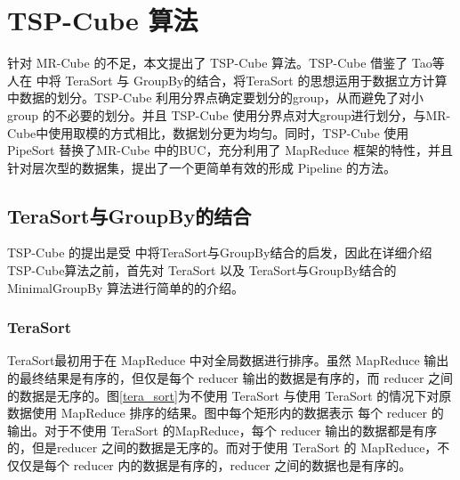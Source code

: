 \chapter{TSP-Cube 算法}

针对 MR-Cube 的不足，本文提出了 TSP-Cube 算法。TSP-Cube 借鉴了 Tao等人在 \cite{tao2013minimal} 中将 TeraSort 与 GroupBy的结合，将TeraSort 的思想运用于数据立方计算中数据的划分。TSP-Cube 利用分界点确定要划分的group，从而避免了对小 group 的不必要的划分。并且 TSP-Cube 使用分界点对大group进行划分，与MR-Cube中使用取模的方式相比，数据划分更为均匀。同时，TSP-Cube 使用PipeSort 替换了MR-Cube 中的BUC，充分利用了 MapReduce 框架的特性，并且针对层次型的数据集，提出了一个更简单有效的形成 Pipeline 的方法。



\section{TeraSort与GroupBy的结合}

TSP-Cube 的提出是受 \cite{tao2013minimal} 中将TeraSort与GroupBy结合的启发，因此在详细介绍TSP-Cube算法之前，首先对 TeraSort 以及 TeraSort与GroupBy结合的 MinimalGroupBy 算法进行简单的的介绍。



\subsection{TeraSort}

TeraSort最初用于在 MapReduce 中对全局数据进行排序。虽然 MapReduce 输出的最终结果是有序的，但仅是每个 reducer 输出的数据是有序的，而 reducer 之间的数据是无序的。图\ref{tera_sort}为不使用 TeraSort 与使用 TeraSort 的情况下对原数据使用 MapReduce 排序的结果。图中每个矩形内的数据表示 每个 reducer 的输出。对于不使用 TeraSort 的MapReduce，每个 reducer 输出的数据都是有序的，但是reducer 之间的数据是无序的。而对于使用 TeraSort 的 MapReduce，不仅仅是每个 reducer 内的数据是有序的，reducer 之间的数据也是有序的。

